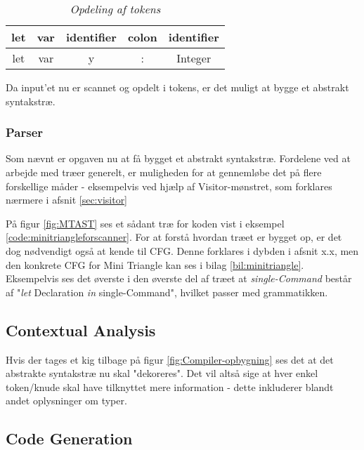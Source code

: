 \begin{table}[H]
\centering
    \begin{tabular}{|c|c|c|c|c|}
    \hline
    \textbf{let} & \textbf{var} & \textbf{identifier} & \textbf{colon} & \textbf{identifier} \\ \hline
    let          & var          & y                   & :              & Integer             \\ \hline
    \end{tabular}
\caption{\textit{Opdeling af tokens}}
\label{tab:tokensMT}
\end{table}

\noindent Da input'et nu er scannet og opdelt i tokens, er det muligt at bygge et abstrakt syntakstræ.

\subsubsection{Parser}
Som nævnt er opgaven nu at få bygget et abstrakt syntakstræ. Fordelene ved at arbejde med træer generelt, er muligheden for at gennemløbe det på flere forskellige måder - eksempelvis ved hjælp af Visitor-mønstret, som forklares nærmere i afsnit \ref{sec:visitor}


\noindent På figur \ref{fig:MTAST} ses et sådant træ for koden vist i eksempel \ref{code:minitriangleforscanner}. For at forstå hvordan træet er bygget op, er det dog nødvendigt også at kende til CFG. Denne forklares i dybden i afsnit x.x, men den konkrete CFG for Mini Triangle kan ses i bilag \ref{bil:minitriangle}. Eksempelvis ses det øverste i den øverste del af træet at \textit{single-Command} består af "\textit{let} Declaration \textit{in} single-Command"\mbox{}, hvilket passer med grammatikken.

\subsection{Contextual Analysis}
Hvis der tages et kig tilbage på figur \ref{fig:Compiler-opbygning} ses det at det abstrakte syntakstræ nu skal "dekoreres"\mbox{}. Det vil altså sige at hver enkel token/knude skal have tilknyttet mere information - dette inkluderer blandt andet oplysninger om typer.\wip{}

\subsection{Code Generation}